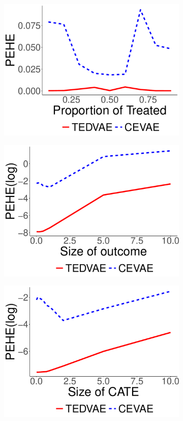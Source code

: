 \documentclass[letterpaper]{article} %
\begin{document}
\begin{figure}[!t]
\centering
\begin{subfigure}{0.15\textwidth}
\includegraphics[width=\linewidth]{synthetic2_alpha.pdf}
\end{subfigure}
\begin{subfigure}{0.15\textwidth}
\includegraphics[width=\linewidth]{synthetic2_beta.pdf}
\end{subfigure}
\begin{subfigure}{0.15\textwidth}
\includegraphics[width=\linewidth]{synthetic2_gamma.pdf}

\end{subfigure}
\end{figure}
\end{document}
